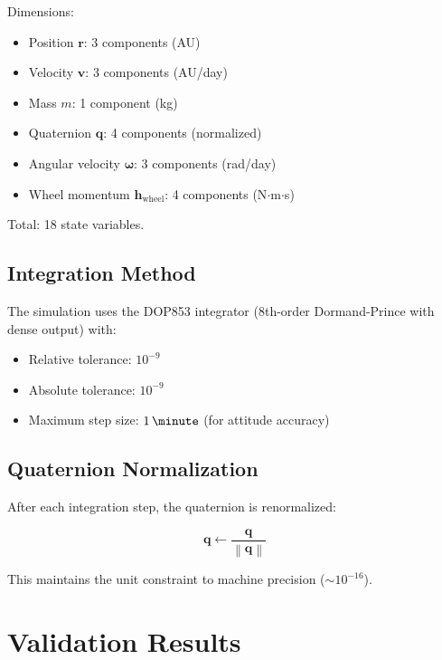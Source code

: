 \documentclass[11pt,a4paper]{article}
\newcommand{\vect}[1]{\bm{#1}}
\newcommand{\quat}[1]{\mathbf{#1}}
\newcommand{\norm}[1]{\left\lVert #1 \right\rVert}
\newcommand{\SI}[2]{#1\,\mathrm{#2}}
\begin{document}
Dimensions:
\begin{itemize}
    \item Position $\vect{r}$: 3 components (AU)
    \item Velocity $\vect{v}$: 3 components (AU/day)
    \item Mass $m$: 1 component (kg)
    \item Quaternion $\quat{q}$: 4 components (normalized)
    \item Angular velocity $\vect{\omega}$: 3 components (rad/day)
    \item Wheel momentum $\vect{h}_\text{wheel}$: 4 components (N$\cdot$m$\cdot$s)
\end{itemize}

Total: 18 state variables.

\subsection{Integration Method}

The simulation uses the DOP853 integrator (8th-order Dormand-Prince with dense output) with:

\begin{itemize}
    \item Relative tolerance: $10^{-9}$
    \item Absolute tolerance: $10^{-9}$
    \item Maximum step size: $\SI{1}{\minute}$ (for attitude accuracy)
\end{itemize}

\subsection{Quaternion Normalization}

After each integration step, the quaternion is renormalized:

\begin{equation}
    \quat{q} \gets \frac{\quat{q}}{\norm{\quat{q}}}
\end{equation}

This maintains the unit constraint to machine precision ($\sim 10^{-16}$).

\section{Validation Results}
\end{document}
